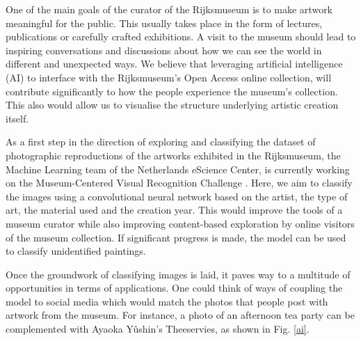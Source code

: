 \documentclass[12pt,a4paper]{report}
\begin{document}
  \par
    One of the main goals of the curator of the Rijksmuseum is to make artwork meaningful for the public. This usually takes place in the form of lectures, publications or carefully crafted exhibitions. A visit to the museum should lead to inspiring conversations and discussions about how we can see the world in different and unexpected ways. We believe that leveraging artificial intelligence (AI) to interface with the Rijksmuseum’s Open Access online collection, will contribute significantly to how the people experience the museum’s collection. This also would allow us to visualise the structure underlying artistic creation itself.

  \par
    As a first step in the direction of exploring and classifying the dataset of photographic reproductions of the artworks exhibited in the Rijksmuseum, the Machine Learning team of the Netherlands eScience Center, is currently working on the Museum-Centered Visual Recognition Challenge \cite{Mensink2014}. Here, we aim to classify the images using a convolutional neural network based on the artist, the type of art, the material used and the creation year. This would improve the tools of a museum curator while also improving content-based exploration by online visitors of the museum collection. If significant progress is made, the model can be used to classify unidentified paintings.

  \par
    Once the groundwork of classifying images is laid, it paves way to a multitude of opportunities in terms of applications. One could think of ways of coupling the model to social media which would match the photos that people post with artwork from the museum. For instance, a photo of an afternoon tea party can be complemented with Ayaoka Yûshin’s Theeservies, as shown in Fig. \ref{ai}.
\end{document}
